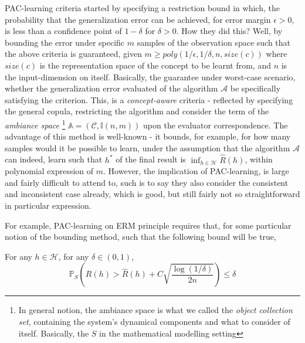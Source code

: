 \documentclass[10pt]{article}
\begin{document}
PAC-learning criteria started by specifying a restriction bound in which, the probability that the generalization error can be achieved, for error margin $\epsilon > 0$, is less than a confidence point of $1-\delta$ for $\delta > 0$. How they did this? Well, by bounding the error under specific $m$ samples of the observation space such that the above criteria is guaranteed, given $m\geq poly(1/\epsilon, 1/\delta, n,size(c))$ where $size(c)$ is the representation space of the concept to be learnt from, and $n$ is the input-dimension on itself. Basically, the guarantee under worst-case scenario, whether the generalization error evaluated of the algorithm $\mathcal{A}$ be specifically satisfying the criterion. This, is a \textit{concept-aware} criteria - reflected by specifying the general copula, restricting the algorithm and consider the term of the \textit{ambiance space} \footnote{In general notion, the ambiance space is what we called the \textit{object collection set}, containing the system's dynamical components and what to consider of itself. Basically, the $S$ in the mathematical modelling setting} $\mathbb{A}=(\mathcal{C},\mathbb{I}(n,m))$ upon the evaluator correspondence. The advantage of this method is well-known - it bounds, for example, for how many samples would it be possible to learn, under the assumption that the algorithm $\mathcal{A}$ can indeed, learn such that $h^{*}$ of the final result is $\inf_{h\in\mathcal{H}}\hat{R}(h)$, within polynomial expression of $m$. However, the implication of PAC-learning, is large and fairly difficult to attend to, such is to say they also consider the consistent and inconsistent case already, which is good, but still fairly not so straightforward in particular expression. 

For example, PAC-learning on ERM principle requires that, for some particular notion of the bounding method, such that the following bound will be true, 


\begin{proposition}\label{prop:PAC_ERM_1_recite}
    For any $h\in\mathcal{H}$, for any $\delta\in(0,1)$, 
    \begin{equation}
        \mathbb{P}_{S}\left( R(h) > \hat{R}(h)+ C\sqrt{\frac{\log{(1/\delta)}}{2n}}\right)\leq \delta
    \end{equation}
\end{proposition}
\end{document}

